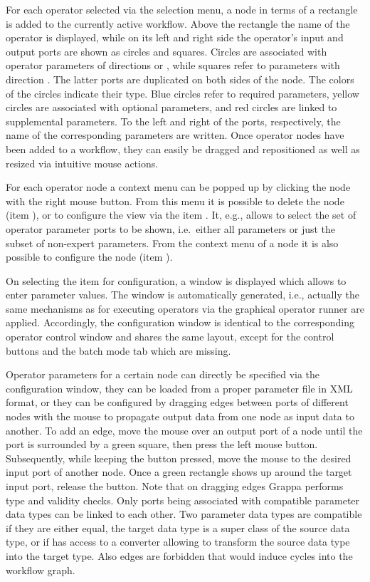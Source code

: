 For each operator selected via the selection menu, a
node in terms of a rectangle is added to the currently active workflow. Above the rectangle 
the name of the operator is displayed, while on its left and right side the operator's input and output ports are shown as circles and 
squares. Circles are associated with operator parameters of directions  or , while squares refer to parameters with
direction . The latter ports are duplicated on both sides of the node.
The colors of the circles indicate their type. Blue circles refer to required parameters, yellow circles are associated with optional 
parameters, and red circles are linked to supplemental parameters. To the left and right of the ports,
respectively, the name of the corresponding parameters are written.  
Once operator nodes have been added to a workflow, they can easily be dragged
and repositioned as well as resized via intuitive mouse actions. 

For each operator node a context menu can be popped up by clicking the node with the right mouse
button. From this menu it is possible to delete the node (item ), or to configure the
view via the item . It, e.g., allows to select the set of operator parameter ports
to be shown, i.e.~either all parameters or just the subset of non-expert parameters. From the
context menu of a node it is also possible to configure the node (item ).  

On selecting the item for
configuration, a window is displayed which allows to enter parameter values.
The window is automatically generated, i.e., actually the same 
mechanisms as for executing operators via the graphical operator runner are applied. Accordingly, 
the configuration window is identical to the corresponding operator control
window and shares the same layout, except for the control buttons and the batch
mode tab which are missing.

Operator parameters for a certain node can directly be specified via the
configuration window, they can be loaded from a proper parameter file in XML
format, or they
can be configured by dragging edges between ports of different nodes with the
mouse to propagate output data from one node as input data to another. To add an
edge, move the mouse over an output port of a node until the port is surrounded
by a green square, then press the left mouse button. Subsequently, while keeping
the button pressed, move the mouse to the desired input port of another node.
Once a green rectangle shows up around the target input port, release the
button. Note that on dragging edges Grappa performs type and validity checks.
Only ports being associated with compatible parameter data types can be
linked to each other. Two parameter data types are compatible if they are
either equal, the target data type is a super class of the source data type, or
if \alida has access to a converter allowing to transform the source data type
into the target type. Also
edges are forbidden that would induce cycles into the workflow graph.

